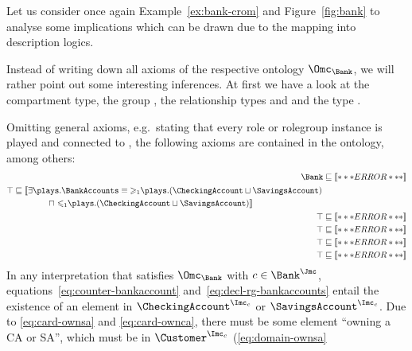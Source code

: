 Let us consider once again Example~\ref{ex:bank-crom} and Figure~\ref{fig:bank} to analyse some
implications which can be drawn due to the mapping into description logics.

\begin{example}
  Instead of writing down all axioms of the respective ontology $\Omc_{\Bank}$, we will rather point
  out some interesting inferences. At first we have a look at the \Bank compartment type, the
  \rosirole group \BankAccounts, the relationship types \ownca and \ownsa and the \rosirole type
  \Customer.

  Omitting general axioms, e.g.\ stating that every role or rolegroup instance is played and
  connected to \occurCounter, the following axioms are contained in the ontology, among others:
  \setLength{\jot}{4pt}
  \begin{align}
    \Bank & \sqsubseteq \oax{(\atleast{1}{\counts}{\BankAccounts})(\occurCounter)}\label{eq:counter-bankaccount}\\
    \begin{split}
      \top & \sqsubseteq \oaxl{\exists\plays.\BankAccounts \equiv \atleast{1}{\plays}{(\CheckingAccount\sqcup\SavingsAccount)}}\\
      & \qquad\qquad \sqcap \oaxr{\atmost{1}{\plays}{(\CheckingAccount\sqcup\SavingsAccount)}}
    \end{split}\label{eq:decl-rg-bankaccounts}\\
    \top & \sqsubseteq \oax{\SavingsAccount\sqsubseteq\atleast{1}{\ownsa^{-}}{\top}}\label{eq:card-ownsa}\\
    \top & \sqsubseteq \oax{\CheckingAccount\sqsubseteq\atleast{1}{\ownca^{-}}{\top}}\label{eq:card-ownca}\\
    \top & \sqsubseteq \oax{\exists\ownsa.\top\sqsubseteq\Customer}\label{eq:domain-ownsa}\\
    \top & \sqsubseteq \oax{\exists\ownca.\top\sqsubseteq\Customer}\label{eq:domain-ownca}
  \end{align}
  \resetLength{\jot}%
  In any interpretation \J that satisfies $\Omc_{\Bank}$ with $c\in\Bank^{\J}$,
  equations~\eqref{eq:counter-bankaccount} and~\eqref{eq:decl-rg-bankaccounts} entail the existence
  of an element in $\CheckingAccount^{\I_{c}}$ or $\SavingsAccount^{\I_{c}}$. Due to
  \eqref{eq:card-ownsa} and \eqref{eq:card-ownca}, there must be some element ``owning a CA or SA'',
  which must be in $\Customer^{\I_{c}}$ (\eqref{eq:domain-ownsa}

\end{example}
